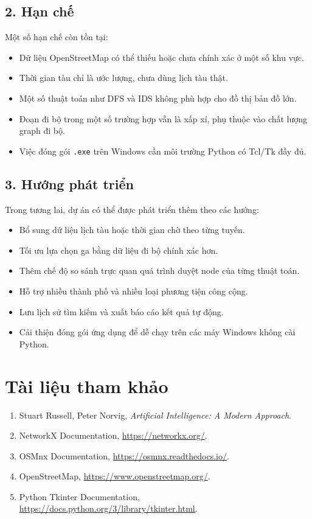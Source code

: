 \documentclass[12pt,a4paper]{article}
\begin{document}
\subsection*{2. Hạn chế}

Một số hạn chế còn tồn tại:
\begin{itemize}
    \item Dữ liệu OpenStreetMap có thể thiếu hoặc chưa chính xác ở một số khu vực.
    \item Thời gian tàu chỉ là ước lượng, chưa dùng lịch tàu thật.
    \item Một số thuật toán như DFS và IDS không phù hợp cho đồ thị bản đồ lớn.
    \item Đoạn đi bộ trong một số trường hợp vẫn là xấp xỉ, phụ thuộc vào chất lượng graph đi bộ.
    \item Việc đóng gói \texttt{.exe} trên Windows cần môi trường Python có Tcl/Tk đầy đủ.
\end{itemize}

\subsection*{3. Hướng phát triển}

Trong tương lai, dự án có thể được phát triển thêm theo các hướng:
\begin{itemize}
    \item Bổ sung dữ liệu lịch tàu hoặc thời gian chờ theo từng tuyến.
    \item Tối ưu lựa chọn ga bằng dữ liệu đi bộ chính xác hơn.
    \item Thêm chế độ so sánh trực quan quá trình duyệt node của từng thuật toán.
    \item Hỗ trợ nhiều thành phố và nhiều loại phương tiện công cộng.
    \item Lưu lịch sử tìm kiếm và xuất báo cáo kết quả tự động.
    \item Cải thiện đóng gói ứng dụng để dễ chạy trên các máy Windows không cài Python.
\end{itemize}

\newpage
\section*{Tài liệu tham khảo}

\begin{enumerate}
    \item Stuart Russell, Peter Norvig, \textit{Artificial Intelligence: A Modern Approach}.
    \item NetworkX Documentation, \url{https://networkx.org/}.
    \item OSMnx Documentation, \url{https://osmnx.readthedocs.io/}.
    \item OpenStreetMap, \url{https://www.openstreetmap.org/}.
    \item Python Tkinter Documentation, \url{https://docs.python.org/3/library/tkinter.html}.
\end{enumerate}
\end{document}
